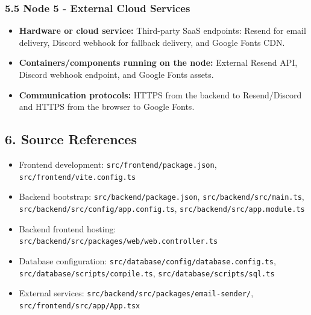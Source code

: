 \documentclass[12pt]{article}
\begin{document}
\hypertarget{sec:5-5-node-5-external-cloud-services}{}
\subsubsection*{5.5 Node 5 - External Cloud Services}
\par\medskip

\begin{itemize}
\item \textbf{Hardware or cloud service:} Third-party SaaS endpoints: Resend for email delivery, Discord webhook for fallback delivery, and Google Fonts CDN.
\item \textbf{Containers/components running on the node:} External Resend API, Discord webhook endpoint, and Google Fonts assets.
\item \textbf{Communication protocols:} HTTPS from the backend to Resend/Discord and HTTPS from the browser to Google Fonts.
\end{itemize}
\par\medskip

\hypertarget{sec:6-source-references}{}
\subsection*{6. Source References}
\par\medskip

\begin{itemize}
\item Frontend development: \texttt{src/frontend/package.json}, \texttt{src/frontend/vite.config.ts}
\item Backend bootstrap: \texttt{src/backend/package.json}, \texttt{src/backend/src/main.ts}, \texttt{src/backend/src/config/app.config.ts}, \texttt{src/backend/src/app.module.ts}
\item Backend frontend hosting: \texttt{src/backend/src/packages/web/web.controller.ts}
\item Database configuration: \texttt{src/database/config/database.config.ts}, \texttt{src/database/scripts/compile.ts}, \texttt{src/database/scripts/sql.ts}
\item External services: \texttt{src/backend/src/packages/email-sender/}, \texttt{src/frontend/src/app/App.tsx}
\end{itemize}
\par\medskip
\end{document}
